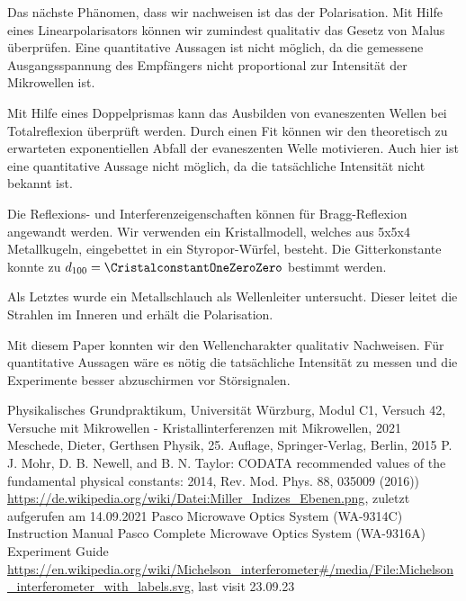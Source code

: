 \documentclass[a4paper,10pt,twocolumn]{article}
\begin{document}
    Das nächste Phänomen, dass wir nachweisen ist das der Polarisation.
    Mit Hilfe eines Linearpolarisators können wir zumindest qualitativ das Gesetz von Malus
    überprüfen.
    Eine quantitative Aussagen ist nicht möglich, da die gemessene Ausgangsspannung des Empfängers 
    nicht proportional zur Intensität der Mikrowellen ist.
    
    Mit Hilfe eines Doppelprismas kann das Ausbilden von evaneszenten Wellen bei Totalreflexion überprüft werden.
    Durch einen Fit können wir den theoretisch zu erwarteten exponentiellen Abfall der evaneszenten Welle motivieren.
    Auch hier ist eine quantitative Aussage nicht möglich, da die tatsächliche Intensität nicht bekannt ist.
    
    Die Reflexions- und Interferenzeigenschaften können für Bragg-Reflexion angewandt werden.
    Wir verwenden ein Kristallmodell, welches aus 5x5x4 Metallkugeln, eingebettet in ein Styropor-Würfel, besteht.
    Die Gitterkonstante konnte zu $d_{100} = \CristalconstantOneZeroZero$ bestimmt werden.
    
    Als Letztes wurde ein Metallschlauch als Wellenleiter untersucht.
    Dieser leitet die Strahlen im Inneren und erhält die Polarisation.
    
    Mit diesem Paper konnten wir den Wellencharakter qualitativ Nachweisen.
    Für quantitative Aussagen wäre es nötig die tatsächliche Intensität zu messen und die
    Experimente besser abzuschirmen vor Störsignalen. 
    
    
    
    \begin{thebibliography}{}    %
         Physikalisches Grundpraktikum, Universität Würzburg, Modul C1, Versuch 42, Versuche mit Mikrowellen - Kristallinterferenzen mit Mikrowellen, 2021
         Meschede, Dieter, Gerthsen Physik, 25. Auflage, Springer-Verlag, Berlin, 2015
         P. J. Mohr, D. B. Newell, and B. N. Taylor: \grqq CODATA
        recommended values of the fundamental physical constants: 2014\grqq , Rev. Mod. Phys.
        88, 035009 (2016))
         \url{https://de.wikipedia.org/wiki/Datei:Miller_Indizes_Ebenen.png}, zuletzt aufgerufen am 14.09.2021
         Pasco Microwave Optics System (WA-9314C) Instruction Manual
         Pasco Complete Microwave Optics System (WA-9316A) Experiment Guide
         \url{https://en.wikipedia.org/wiki/Michelson_interferometer#/media/File:Michelson_interferometer_with_labels.svg}, last visit 23.09.23
    \end{thebibliography}
    
\end{document}
